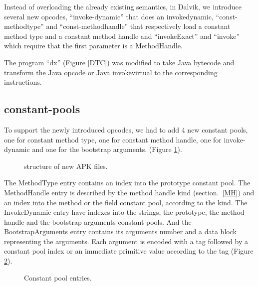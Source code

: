\documentclass{sig-alternate}
\begin{document}
    Instead of overloading the already existing semantics, in Dalvik, we introduce several new opcodes,
    ``invoke-dynamic'' that does an invokedynamic,
    ``const-methodtype'' and ``const-methodhandle'' that respectively load a constant method type
    and a constant method handle and ``invokeExact'' and ``invoke'' which require that the first parameter
    is a MethodHandle.

    The program ``dx'' (Figure \ref{DTC}) was modified to take Java bytecode and 
    transform the Java opcode or Java invokevirtual to the corresponding instructions.

  \subsection{constant-pools}
    \label{CP}

    To support the newly introduced opcodes, we had to add 4 new constant pools,
    one for constant method type, one for constant method handle, one for invoke-dynamic
    and one for the bootstrap arguments. (Figure \ref{SNA}).

    \begin{figure}[!h]
      \centering \resizebox{.45\linewidth}{!}{}
      \caption{structure of new APK files.}
      \label{SNA}
    \end{figure}

    The MethodType entry contains an index into the prototype constant pool.
    The MethodHandle entry is described by the method handle kind (section.~\ref{MH})
    and an index into the method or the field constant pool, according to the kind.
    The InvokeDynamic entry have indexes into the strings, the prototype,
    the method handle and the bootstrap arguments constant pools.
    And the BootstrapArguments entry contains its arguments number
    and a data block representing the arguments.
    Each argument is encoded with a tag followed by a constant pool index or
    an immediate primitive value according to the tag (Figure \ref{CPentries}).

    \begin{figure}[!h]
      \centering 
      \centering 
      \centering 
      \centering \vspace{-1.5em}
      \caption{Constant pool entries.}
      \label{CPentries}
    \end{figure}
\end{document}
